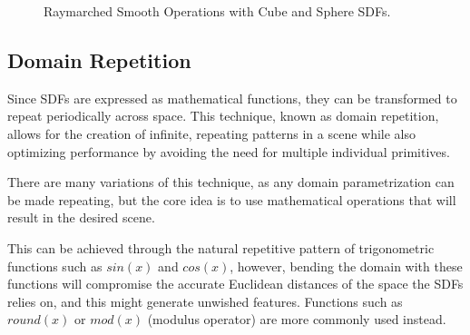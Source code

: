 \begin{figure}[h!]
    \caption{Raymarched Smooth Operations with Cube and Sphere SDFs.}
    \label{fig:smooth_sdf_operations}
\end{figure}

\subsection{Domain Repetition}

Since SDFs are expressed as mathematical functions, they can be transformed to repeat periodically across space. This technique, known as domain repetition, allows for the creation of infinite, repeating patterns in a scene while also optimizing performance by avoiding the need for multiple individual primitives.

There are many variations of this technique, as any domain parametrization can be made repeating, but the core idea is to use mathematical operations that will result in the desired scene. 

This can be achieved through the natural repetitive pattern of trigonometric functions such as $sin(x)$ and $cos(x)$, however, bending the domain with these functions will compromise the accurate Euclidean distances of the space the SDFs relies on, and this might generate unwished features. Functions such as $round(x)$ or $mod(x)$ (modulus operator) are more commonly used instead.

